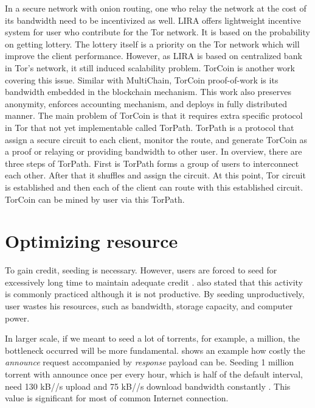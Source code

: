 In a secure network with onion routing, one who relay the network at the cost of its bandwidth need to be incentivized as well. LIRA \cite{2013:lira:jansen} offers lightweight incentive system for user who contribute for the Tor network. It is based on the probability on getting lottery. The lottery itself is a priority on the Tor network which will improve the client performance. However, as LIRA is based on centralized bank in Tor's network, it still induced scalability problem. TorCoin \cite{2014:torcoin:ghosh} is another work covering this issue. Similar with MultiChain, TorCoin proof-of-work is its bandwidth embedded in the blockchain mechanism. This work also preserves anonymity, enforces accounting mechanism, and deploys in fully distributed manner. The main problem of TorCoin is that it requires extra specific protocol in Tor that not yet implementable called TorPath. TorPath is a protocol that assign a secure circuit to each client, monitor the route, and generate TorCoin as a proof or relaying or providing bandwidth to other user. In overview, there are three steps of TorPath. First is TorPath forms a group of users to interconnect each other. After that it shuffles and assign the circuit. At this point, Tor circuit is established and then each of the client can route with this established circuit. TorCoin can be mined by user via this TorPath.

\section{Optimizing resource}
To gain credit, seeding is necessary. However, users are forced to seed for excessively long time to maintain adequate credit \cite{2013:survivepriv:jia}. \citeauthor{2013:survivepriv:jia} also stated that this activity is commonly practiced although it is not productive. By seeding unproductively, user wastes his resources, such as bandwidth, storage capacity, and computer power.

In larger scale, if we meant to seed a lot of torrents, for example, a million, the bottleneck occurred will be more fundamental. \citeauthor{2012:milliontorrent:arvid} shows an example how costly the \textit{announce} request accompanied by \textit{response} payload can be. Seeding 1 million torrent with announce once per every hour, which is half of the default interval, need 130 kB//s upload and 75 kB//s download bandwidth constantly \cite{2012:milliontorrent:arvid}. This value is significant for most of common Internet connection.

